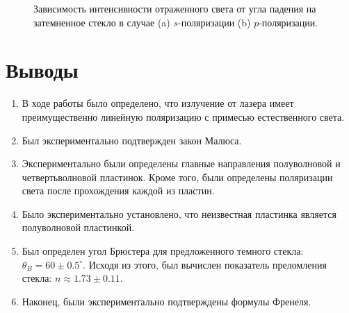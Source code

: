 \documentclass[a4paper, 12pt]{article}
\begin{document}
\begin{figure}[H]
	\centering
	\caption{Зависимость интенсивности отраженного света от угла падения на затемненное стекло в случае (a) $s$-поляризации (b) $p$-поляризации.}
\end{figure}

\section{Выводы}

\begin{enumerate}
	\item В ходе работы было определено, что излучение от лазера имеет преимущественно линейную поляризацию с примесью естественного света.
	
	\item Был экспериментально подтвержден закон Малюса.
	
	\item Экспериментально были определены главные направления полуволновой и четвертьволновой пластинок. Кроме того, были определены поляризации света после прохождения каждой из пластин.
	
	\item Было экспериментально установлено, что неизвестная пластинка является полуволновой пластинкой.
	
	\item Был определен угол Брюстера для предложенного темного стекла: $\theta_{B}=60\pm0.5^\circ$. Исходя из этого, был вычислен показатель преломления стекла: $n \approx 1.73 \pm 0.11$.
	
	\item Наконец, были экспериментально подтверждены формулы Френеля.
\end{enumerate}
\end{document}
